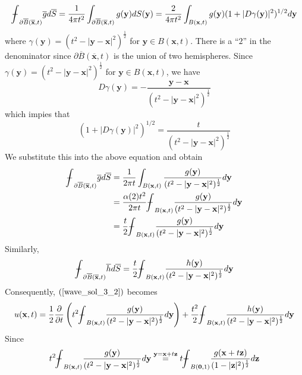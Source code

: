 \documentclass[10pt]{article}
\def\vc{{\mathbf x}}
\def\vcc{{\mathbf y}}
\def\vccc{{\mathbf z}}
\newcommand\tbbint{{-\mkern -16mu\int}}
\newcommand\dbbint{{-\mkern -19mu\int}}
\newcommand\bbint{
{\mathchoice{\dbbint}{\tbbint}{\tbbint}{\tbbint}}
}
\begin{document}
\begin{equation*}
    \bbint_{\partial \overline{B} (\overline{\vc},t)}\overline{g} d\overline{S} = \frac{1}{4\pi t^2} \int_{\partial \overline{B} (\overline{\vc},t)} g(\vcc) dS(\vcc) = \frac{2}{4 \pi t^2} \int_{B (\vc,t)} g(\vcc)(1+|D \gamma (\vcc)|^2)^{1/2} d\vcc
\end{equation*}
where $\gamma(\vcc) = (t^2 - |\vcc-\vc|^2)^{\frac{1}{2}}$ for $\vcc \in B(\vc,t)$. There is a ``$2$'' in the denominator since $\partial \overline{B}(\overline{\vc},t)$ is the union of two hemispheres. Since $\gamma(\vcc) = (t^2 - |\vcc-\vc|^2)^{\frac{1}{2}}$ for $\vcc \in B(\vc,t)$, we have
\begin{equation*}
    D \gamma(\vcc) = - \frac{\vcc-\vc}{(t^2 - |\vcc-\vc|^2)^{\frac{1}{2}}} 
\end{equation*}
which impies that
\begin{equation*}
    (1+|D \gamma (\vcc)|^2)^{1/2} = \frac{t}{(t^2 - |\vcc-\vc|^2)^{\frac{1}{2}}}
\end{equation*}
We substitute this into the above equation and obtain
\begin{align*}
    \bbint_{\partial \overline{B} (\overline{\vc},t)}\overline{g} d\overline{S} &= \frac{1}{2\pi t} \int_{B (\vc,t)} \frac{g(\vcc)}{(t^2 - |\vcc-\vc|^2)^{\frac{1}{2}}} d\vcc \\
    & = \frac{\alpha(2)t^2}{2\pi t} \bbint_{B(\vc,t)} \frac{g(\vcc)}{(t^2 - |\vcc-\vc|^2)^{\frac{1}{2}}} d\vcc \\
    &= \frac{t}{2} \bbint_{B(\vc,t)} \frac{g(\vcc)}{(t^2 - |\vcc-\vc|^2)^{\frac{1}{2}}} d\vcc \\
\end{align*}
Similarly,
\begin{align*}
    \bbint_{\partial \overline{B} (\overline{\vc},t)}\overline{h} d\overline{S} &= \frac{t}{2} \bbint_{B(\vc,t)} \frac{h(\vcc)}{(t^2 -|\vcc-\vc|^2)^{\frac{1}{2}}} d\vcc \\
\end{align*}
Consequently, $(\ref{wave_sol_3_2})$ becomes
\begin{equation*}
    u(\vc,t) = \frac{1}{2}\frac{\partial }{\partial t}\left(t^2 \bbint_{B(\vc,t)} \frac{g(\vcc)}{(t^2 - |\vcc-\vc|^2)^{\frac{1}{2}}} d\vcc\right) + \frac{t^2}{2} \bbint_{B(\vc,t)} \frac{h(\vcc)}{(t^2 - |\vcc-\vc|^2)^{\frac{1}{2}}} d\vcc
\end{equation*}
Since 
\begin{equation*}
    t^2\bbint_{B(\vc,t)} \frac{g(\vcc)}{(t^2 - |\vcc-\vc|^2)^{\frac{1}{2}}} d\vcc \overset{\vcc = \vc+t\vccc}{=}t \bbint_{B(\mathbf{0},1)} \frac{g(\vc+t\vccc)}{(1-|\vccc|^2)^{\frac{1}{2}}} d\vccc
\end{equation*}
\end{document}
